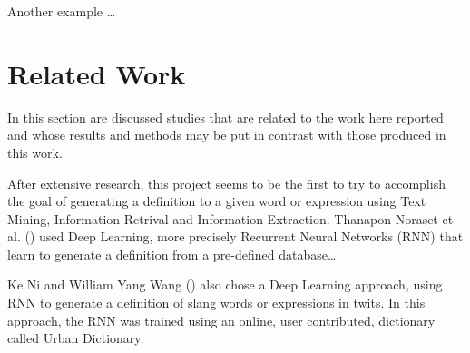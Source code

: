 Another example \dots

\section{Related Work}

In this section are discussed studies that are related to the work here reported and whose results and methods may be put in contrast with those produced in this work.

After extensive research, this project seems to be the first to try to accomplish the goal of generating a definition to a given word or expression using Text Mining, Information Retrival and Information Extraction.
Thanapon Noraset et al. (\citeyear{Reference3}) used Deep Learning, more precisely Recurrent Neural Networks (RNN) that learn to generate a definition from a pre-defined database\dots

Ke Ni and William Yang Wang (\citeyear{Reference2}) also chose a Deep Learning approach, using RNN to generate a definition of slang words or expressions in twits.
In this approach, the RNN was trained using an online, user contributed, dictionary called Urban Dictionary.
